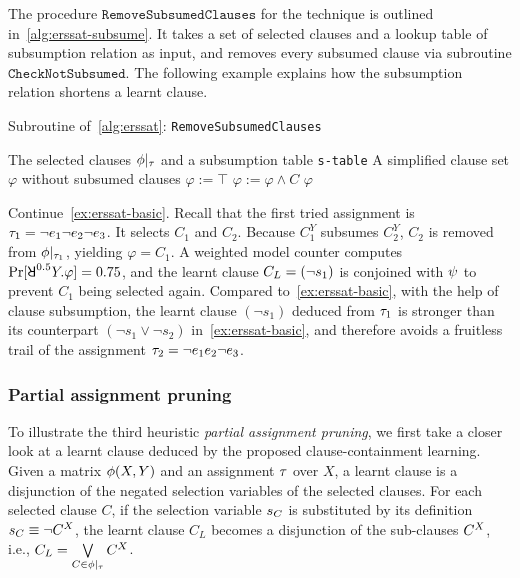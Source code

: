 The procedure $\texttt{RemoveSubsumedClauses}$ for the technique is outlined in~\cref{alg:erssat-subsume}.
It takes a set of selected clauses and a lookup table of subsumption relation as input,
and removes every subsumed clause via subroutine $\texttt{CheckNotSubsumed}$.
The following example explains how the subsumption relation shortens a learnt clause.

\begin{algorithm}[ht]
    \caption{Subroutine of~\cref{alg:erssat}: \texttt{RemoveSubsumedClauses}}
    \label{alg:erssat-subsume}
    \begin{algorithmic}[1]
        \REQUIRE The selected clauses $\phi|_{\tau}$ and a subsumption table \texttt{s-table}
        \ENSURE A simplified clause set $\varphi$ without subsumed clauses
        \STATE $\varphi := \top$
        \STATE $\varphi := \varphi \land C$
        \ENDIF
        \ENDFOR
        \RETURN $\varphi$
    \end{algorithmic}
\end{algorithm}

\begin{example}
    \label{ex:erssat-subsume}
    Continue~\cref{ex:erssat-basic}.
    Recall that the first tried assignment is $\tau_1=\lnot e_1 \lnot e_2 \lnot e_3$.
    It selects $C_1$ and $C_2$.
    Because $C_1^Y$ subsumes $C_2^Y$,
    $C_2$ is removed from $\phi|_{\tau_1}$, yielding $\varphi=C_1$.
    A weighted model counter computes $\spb{\random{0.5}Y.\varphi}=0.75$,
    and the learnt clause $C_L=(\lnot s_{1})$ is conjoined with $\psi$ to prevent $C_1$ being selected again.
    Compared to~\cref{ex:erssat-basic}, with the help of clause subsumption,
    the learnt clause $(\lnot s_1)$ deduced from $\tau_1$ is stronger than its counterpart $(\lnot s_1 \lor \lnot s_2)$ in~\cref{ex:erssat-basic},
    and therefore avoids a fruitless trail of the assignment $\tau_2=\lnot e_1 e_2 \lnot e_3$.
\end{example}

\subsubsection{Partial assignment pruning}
To illustrate the third heuristic \textit{partial assignment pruning},
we first take a closer look at a learnt clause deduced by the proposed clause-containment learning.
Given a matrix $\phi(X,Y)$ and an assignment $\tau$ over $X$,
a learnt clause is a disjunction of the negated selection variables of the selected clauses.
For each selected clause $C$,
if the selection variable $s_{C}$ is substituted by its definition $s_{C}\equiv\lnot C^X$,
the learnt clause $C_L$ becomes a disjunction of the sub-clauses $C^X$,
i.e., $C_L=\bigvee\limits_{C\in\phi|_{\tau}}C^X$.

